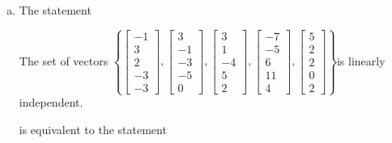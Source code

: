 \begin{exerciseAnswer}
\begin{enumerate}[(a)]
\item The statement 
\begin{center}\begin{minipage}{0.8\textwidth}
 The set of vectors \( \left\{ \left[\begin{array}{c}
-1 \\
3 \\
2 \\
-3 \\
-3
\end{array}\right] , \left[\begin{array}{c}
3 \\
-1 \\
-3 \\
-5 \\
0
\end{array}\right] , \left[\begin{array}{c}
3 \\
1 \\
-4 \\
5 \\
2
\end{array}\right] , \left[\begin{array}{c}
-7 \\
-5 \\
6 \\
11 \\
4
\end{array}\right] , \left[\begin{array}{c}
5 \\
2 \\
2 \\
0 \\
2
\end{array}\right] \right\} \)is linearly independent.
\end{minipage}\end{center}
     is equivalent to the statement 
\begin{center}\begin{minipage}{0.8\textwidth}
 The vector equation \( x_{1} \left[\begin{array}{c}
-1 \\
3 \\
2 \\
-3 \\
-3
\end{array}\right] + x_{2} \left[\begin{array}{c}
3 \\
-1 \\

\end{array}
\end{minipage}
\end{center}
\end{enumerate}
\end{exerciseAnswer}
